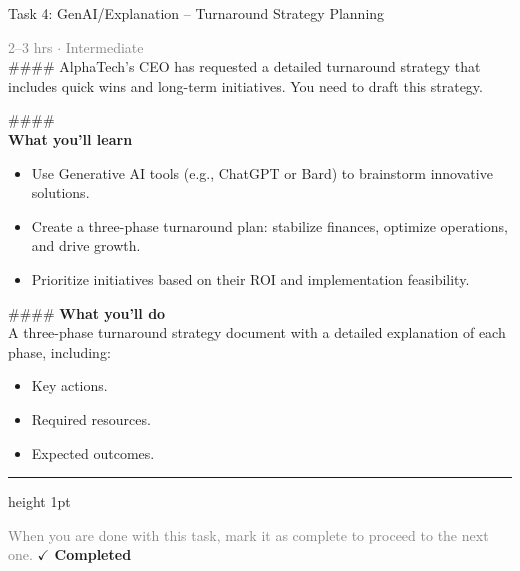 \documentclass[10pt,a4paper]{article}
\begin{document}
\begin{taskbox}{Task 4: GenAI/Explanation – Turnaround Strategy Planning}

    {\small \textcolor{gray}{2--3 hrs $\cdot$ Intermediate}}\\[12pt]

    \#\#\#\#   
AlphaTech’s CEO has requested a detailed turnaround strategy that includes quick wins and long-term initiatives. You need to draft this strategy.  

\#\#\#\# \\[10pt]
\vspace{8pt}
{\large \textbf{\textcolor{brandLight}{What you'll learn}}}\\[4pt]  
\begin{itemize}
    \item Use Generative AI tools (e.g., ChatGPT or Bard) to brainstorm innovative solutions.  
    \item Create a three-phase turnaround plan: stabilize finances, optimize operations, and drive growth.  
    \item Prioritize initiatives based on their ROI and implementation feasibility.  
\end{itemize}

\#\#\#\# \vspace{8pt}
{\large \textbf{\textcolor{brandLight}{What you'll do}}}\\[4pt]  
A three-phase turnaround strategy document with a detailed explanation of each phase, including:  
\begin{itemize}
    \item Key actions.  
    \item Required resources.  
    \item Expected outcomes.\par
\end{itemize}

    \vspace{16pt}

    \textcolor{cardBorder}{\hrule height 1pt}\vspace{8pt}

    \small \textcolor{gray}{When you are done with this task, mark it as complete to proceed to the next one.} \hfill \textbf{\textcolor{brandDark}{$\checkmark$ Completed}}

\end{taskbox}
\end{document}
